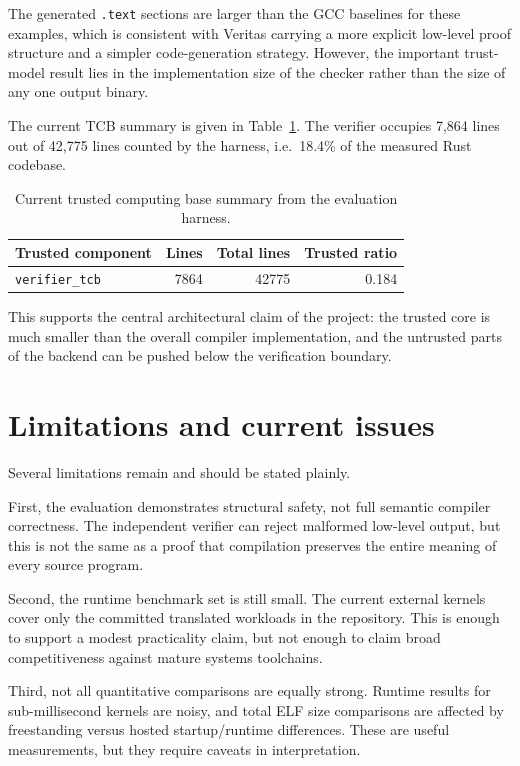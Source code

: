 The generated \texttt{.text} sections are larger than the GCC baselines for
these examples, which is consistent with Veritas carrying a more explicit
low-level proof structure and a simpler code-generation strategy. However, the
important trust-model result lies in the implementation size of the checker
rather than the size of any one output binary.

The current TCB summary is given in Table~\ref{tab:tcb}. The verifier occupies
7,864 lines out of 42,775 lines counted by the harness, i.e.\ 18.4\% of the
measured Rust codebase.

\begin{table}[h]
  \centering
  \begin{tabular}{l r r r}
    \hline
    \textbf{Trusted component} & \textbf{Lines} & \textbf{Total lines} & \textbf{Trusted ratio} \\
    \hline
    \texttt{verifier\_tcb}     & 7864           & 42775                & 0.184                  \\
    \hline
  \end{tabular}
  \caption{Current trusted computing base summary from the evaluation harness.}
  \label{tab:tcb}
\end{table}

This supports the central architectural claim of the project: the trusted core
is much smaller than the overall compiler implementation, and the untrusted
parts of the backend can be pushed below the verification boundary.

\section{Limitations and current issues}

Several limitations remain and should be stated plainly.

First, the evaluation demonstrates structural safety, not full semantic
compiler correctness. The independent verifier can reject malformed low-level
output, but this is not the same as a proof that compilation preserves the
entire meaning of every source program.

Second, the runtime benchmark set is still small. The current external kernels
cover only the committed translated workloads in the repository. This is enough
to support a modest practicality claim, but not enough to claim broad
competitiveness against mature systems toolchains.

Third, not all quantitative comparisons are equally strong. Runtime results for
sub-millisecond kernels are noisy, and total ELF size comparisons are affected
by freestanding versus hosted startup/runtime differences. These are useful
measurements, but they require caveats in interpretation.

